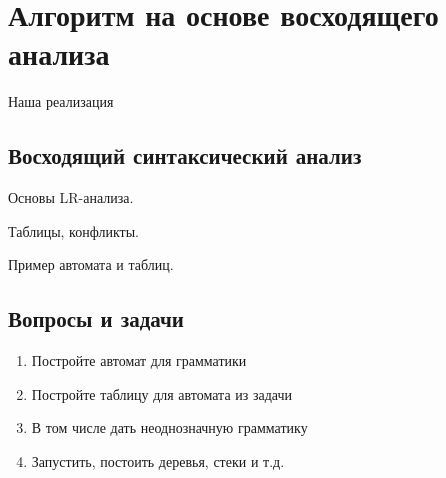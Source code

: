 \section{Алгоритм на основе восходящего анализа}

Наша реализация~\cite{10.1007/978-3-319-41579-6_22}

\subsection{Восходящий синтаксический анализ}

Основы LR-анализа. 

Таблицы, конфликты.

Пример автомата и таблиц.

\subsection{Вопросы и задачи}
\begin{enumerate}
\item Постройте автомат для грамматики
\item Постройте таблицу для автомата из задачи
\item В том числе дать неоднозначную грамматику
\item Запустить, постоить деревья, стеки и т.д.
\end{enumerate}